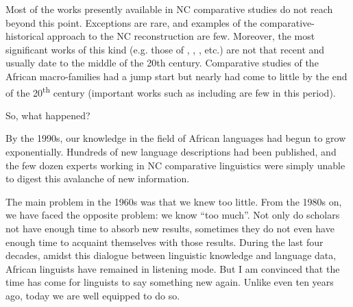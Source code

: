 \begin{table}
\end{table}



Most of the works presently available in NC comparative studies do not reach beyond this point. Exceptions are rare, and examples of the comparative-his\-tor\-i\-cal approach to the NC reconstruction are few. Moreover, the most significant works of this kind (e.g. those of \citealt{Westermann1927}, \citealt{Greenberg1966}, \citealt{Sebeok1971}, etc.) are not that recent and usually date to the middle of the 20th century. Comparative studies of the African macro-families had a jump start but nearly had come to little by the end of the 20\textsuperscript{th} century (important works such as  \citealt{Bendor-Samuel1989} including \citealt{Williamson1988,Williamson1989a} are few in this period).

So, what happened? 

By the 1990s, our knowledge in the field of African languages had begun to grow exponentially. Hundreds of new language descriptions had been published, and the few dozen experts working in NC comparative linguistics were simply unable to digest this avalanche of new information. 

The main problem in the 1960s was that we knew too little. From the 1980s on, we have faced the opposite problem: we know “too much”. Not only do scholars not have enough time to absorb new results, sometimes they do not even have enough time to acquaint themselves with those results. During the last four decades, amidst this dialogue between linguistic knowledge and language data, African linguists have remained in listening mode. But I am convinced that the time has come for linguists to say something new again. Unlike even ten years ago, today we are well equipped to do so.

